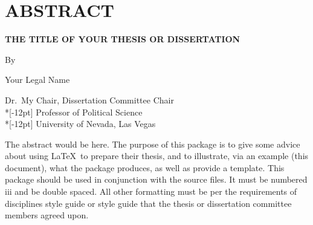 \chapter*{ABSTRACT}

\begin{center}
\textbf{THE TITLE OF YOUR THESIS OR DISSERTATION}

By

Your Legal Name

 Dr.\ My Chair, Dissertation Committee
 Chair\\*[-12pt]%
 Professor of Political Science \\*[-12pt]
 University of Nevada, Las Vegas  %
 \end{center}

The abstract would be here.  The purpose of this package is to give some advice about using \LaTeX\ to prepare their thesis, and to illustrate, via an example (this document), what the package produces, as well as provide a template.  This package should be used in conjunction with the source files. It must be numbered iii and be double spaced. All other formatting must be per the requirements of disciplines style guide or style guide that the thesis or dissertation committee members agreed upon.
